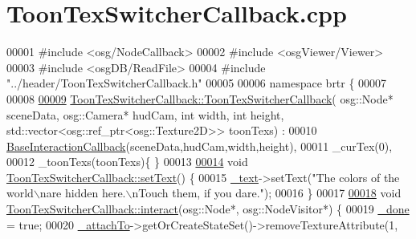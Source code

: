 \hypertarget{_toon_tex_switcher_callback_8cpp_source}{\section{Toon\+Tex\+Switcher\+Callback.\+cpp}
\label{_toon_tex_switcher_callback_8cpp_source}
}

\begin{DoxyCode}
00001 \textcolor{preprocessor}{#include <osg/NodeCallback>}
00002 \textcolor{preprocessor}{#include <osgViewer/Viewer>}
00003 \textcolor{preprocessor}{#include <osgDB/ReadFile>}
00004 \textcolor{preprocessor}{#include "../header/ToonTexSwitcherCallback.h"}
00005 
00006 \textcolor{keyword}{namespace }brtr \{
00007    
00008 
\hypertarget{_toon_tex_switcher_callback_8cpp_source_l00009}{}\hyperlink{classbrtr_1_1_toon_tex_switcher_callback_ae117afe5056c885a625a850e1d0fbae7}{00009}     \hyperlink{classbrtr_1_1_toon_tex_switcher_callback_ae117afe5056c885a625a850e1d0fbae7}{ToonTexSwitcherCallback::ToonTexSwitcherCallback}(
      osg::Node* sceneData, osg::Camera* hudCam, \textcolor{keywordtype}{int} width, \textcolor{keywordtype}{int} height, std::vector<osg::ref\_ptr<osg::Texture2D>> 
      toonTexs) :
00010     \hyperlink{classbrtr_1_1_base_interaction_callback}{BaseInteractionCallback}(sceneData,hudCam,width,height),
00011     \_curTex(0),
00012     \_toonTexs(toonTexs)\{ \}
00013 
\hypertarget{_toon_tex_switcher_callback_8cpp_source_l00014}{}\hyperlink{classbrtr_1_1_toon_tex_switcher_callback_aad13301231829b5c28f14910d4d44355}{00014}     \textcolor{keywordtype}{void} \hyperlink{classbrtr_1_1_toon_tex_switcher_callback_aad13301231829b5c28f14910d4d44355}{ToonTexSwitcherCallback::setText}() \{
00015         \hyperlink{classbrtr_1_1_base_interaction_callback_af60dece4300b09fafe3c048397122cbd}{\_text}->setText(\textcolor{stringliteral}{"The colors of the world\(\backslash\)nare hidden here.\(\backslash\)nTouch them, if you dare."});
00016     \}
00017 
\hypertarget{_toon_tex_switcher_callback_8cpp_source_l00018}{}\hyperlink{classbrtr_1_1_toon_tex_switcher_callback_a97047bc2817ddfecc2c1531d22e289fd}{00018}     \textcolor{keywordtype}{void} \hyperlink{classbrtr_1_1_toon_tex_switcher_callback_a97047bc2817ddfecc2c1531d22e289fd}{ToonTexSwitcherCallback::interact}(osg::Node*, osg::NodeVisitor*) 
      \{
00019         \hyperlink{classbrtr_1_1_base_interaction_callback_a2f36052886ec60a227e0734bfbc4bdbb}{\_done} = \textcolor{keyword}{true};
00020         \hyperlink{classbrtr_1_1_base_interaction_callback_a6666bae9f8f89ebbf75637c922ebfb54}{\_attachTo}->getOrCreateStateSet()->removeTextureAttribute(1, 

\end{DoxyCode}
